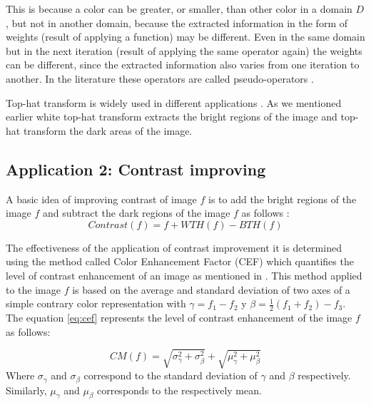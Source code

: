 This is because a color can be greater, or smaller, than other color in a domain $D$, but not in another domain, because the extracted information in the form of weights (result of applying a function) may be different. Even in the same domain but in the next iteration (result of applying the same operator again) the weights can be different, since the extracted information also varies from one iteration to another. In the literature these operators are called pseudo-operators \cite{hanbury2001morphological,aptoula2007pseudo,aptoula2008alpha,angulo2010pseudo,chen2002pseudo}. 

Top-hat transform is widely used in different applications \cite{soille2013morphological,mukhopadhyay2000multiscale,soille1997note,bai2010analysis,bai2010infrared,bai2010analysis1}. As we mentioned earlier white top-hat transform extracts the bright  regions of the image and  top-hat transform the dark areas of the image.

\subsection{Application 2: Contrast improving}
 A basic idea of improving contrast of image $f$ is to add the bright regions of the image $f$  and subtract the dark regions of the image $f$  as follows \cite{soille2013morphological}:
\begin{equation}
\label{contraste}
Contrast(f) = f + WTH(f) - BTH(f) 
\end{equation}


The effectiveness of the application of contrast improvement it is determined using the method called Color Enhancement Factor (CEF) which quantifies the level of contrast enhancement of an image as mentioned in \cite{susstrunk2003color}. This method applied to the image $f$ is based on the average and standard deviation of two axes of a simple contrary color representation with $\gamma = f_1 - f_2$ y $\beta = \frac{1}{2}(f_1 + f_2) - f_3$.
The equation \ref{eq:cef} represents the level of contrast enhancement of the image $f$ as follows:

\begin{equation}
CM(f)=\sqrt{\sigma_{\gamma}^{2} + \sigma_{\beta}^{2}} + \sqrt{\mu_{\gamma}^{2} + \mu_{\beta}^{2}}
\label{eq:cef}
\end{equation} Where $\sigma_{\gamma}$ and $\sigma_{\beta}$ correspond to the standard deviation of $\gamma$ and $\beta$ respectively. Similarly, $\mu_{\gamma}$ and $\mu_{\beta}$ corresponds to the respectively mean.

